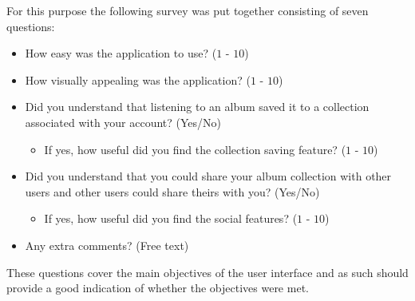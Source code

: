 For this purpose the following survey was put together consisting of seven questions:
\begin{itemize}
    \item How easy was the application to use? ($1$ - $10$)
    \item How visually appealing was the application? ($1$ - $10$)
    \item Did you understand that listening to an album saved it to a collection associated with your account? (Yes/No)
    \begin{itemize}
        \item If yes, how useful did you find the collection saving feature? ($1$ - $10$)
    \end{itemize}
    \item Did you understand that you could share your album collection with other users and other users could share theirs with you? (Yes/No)
    \begin{itemize}
        \item If yes, how useful did you find the social features? ($1$ - $10$)
    \end{itemize}
    \item Any extra comments? (Free text)
\end{itemize}

These questions cover the main objectives of the user interface and as such should provide a good indication of whether the objectives were met.

